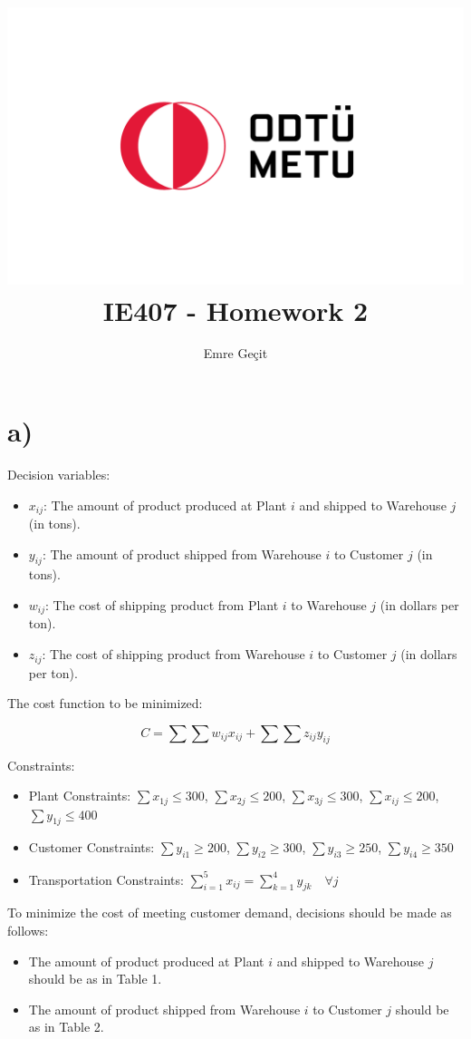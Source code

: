 \documentclass{article}
\author{Emre Geçit}
\title{\includegraphics{9.4.png}\\ IE407 - Homework 2}
\begin{document}
\maketitle

\newpage

\section*{a)}

Decision variables:
\begin{itemize}
    \item $x_{ij}$: The amount of product produced at Plant $i$ and shipped to Warehouse $j$ (in tons).
    \item $y_{ij}$: The amount of product shipped from Warehouse $i$ to Customer $j$ (in tons).
    \item $w_{ij}$: The cost of shipping product from Plant $i$ to Warehouse $j$ (in dollars per ton).
    \item $z_{ij}$: The cost of shipping product from Warehouse $i$ to Customer $j$ (in dollars per ton).
\end{itemize}

The cost function to be minimized:

\begin{equation}
    C = \sum \sum w_{ij} x_{ij} + \sum \sum z_{ij} y_{ij}
\end{equation}

Constraints:

\begin{itemize}
    \item Plant Constraints: $\sum{x_{1j}} \leq 300$, $\sum{x_{2j}} \leq 200$, $\sum{x_{3j}} \leq 300$, $\sum{x_{ij}} \leq 200$, $\sum{y_{1j}} \leq 400$
    \item Customer Constraints: $\sum{y_{i1}} \geq 200$, $\sum{y_{i2}} \geq 300$, $\sum{y_{i3}} \geq 250$, $\sum{y_{i4}} \geq 350$
    \item Transportation Constraints: $\sum_{i=1}^5 {x_{ij}} = \sum_{k=1}^4 {y_{jk}} \quad \forall j$
\end{itemize}

To minimize the cost of meeting customer demand, decisions should be made as follows:

\begin{itemize}
    \item The amount of product produced at Plant $i$ and shipped to Warehouse $j$ should be as in Table 1.
    \item The amount of product shipped from Warehouse $i$ to Customer $j$ should be as in Table 2.
\end{itemize}
\end{document}
